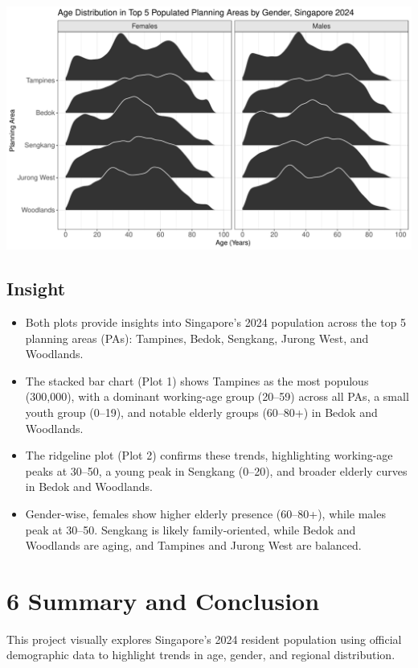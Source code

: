 \documentclass[
  letterpaper,
  DIV=11,
  numbers=noendperiod]{scrartcl}
\begin{document}
\includegraphics{Take-home_Ex01_files/figure-pdf/unnamed-chunk-12-1.pdf}

\subsection{Insight}\label{insight-2}

\begin{itemize}
\item
  Both plots provide insights into Singapore's 2024 population across
  the top 5 planning areas (PAs): Tampines, Bedok, Sengkang, Jurong
  West, and Woodlands.
\item
  The stacked bar chart (Plot 1) shows Tampines as the most populous
  (300,000), with a dominant working-age group (20--59) across all PAs,
  a small youth group (0--19), and notable elderly groups (60--80+) in
  Bedok and Woodlands.
\item
  The ridgeline plot (Plot 2) confirms these trends, highlighting
  working-age peaks at 30--50, a young peak in Sengkang (0--20), and
  broader elderly curves in Bedok and Woodlands.
\item
  Gender-wise, females show higher elderly presence (60--80+), while
  males peak at 30--50. Sengkang is likely family-oriented, while Bedok
  and Woodlands are aging, and Tampines and Jurong West are balanced.
\end{itemize}

\section{6 Summary and Conclusion}\label{summary-and-conclusion}

This project visually explores Singapore's 2024 resident population
using official demographic data to highlight trends in age, gender, and
regional distribution.
\end{document}

